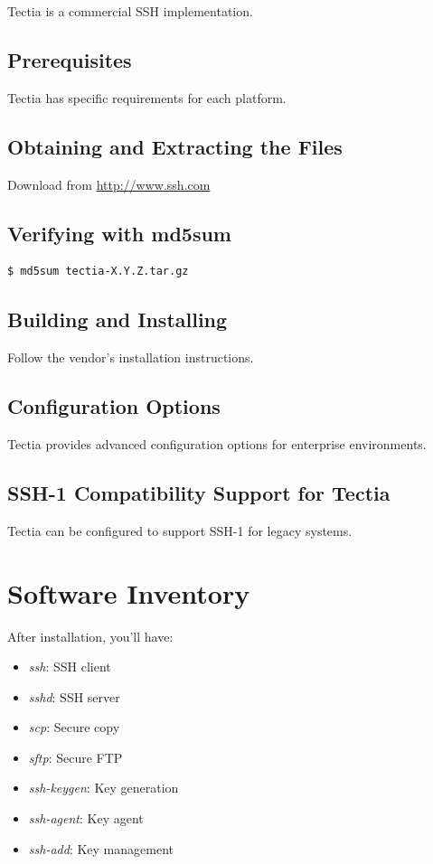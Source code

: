 \documentclass[12pt]{book}
\begin{document}
Tectia is a commercial SSH implementation.

\subsection{Prerequisites}

Tectia has specific requirements for each platform.

\subsection{Obtaining and Extracting the Files}

Download from \url{http://www.ssh.com}

\subsection{Verifying with md5sum}

\begin{lstlisting}[language=bash]
$ md5sum tectia-X.Y.Z.tar.gz
\end{lstlisting}

\subsection{Building and Installing}

Follow the vendor's installation instructions.

\subsection{Configuration Options}

Tectia provides advanced configuration options for enterprise environments.

\subsection{SSH-1 Compatibility Support for Tectia}

Tectia can be configured to support SSH-1 for legacy systems.

\section{Software Inventory}

After installation, you'll have:
\begin{itemize}
    \item \textit{ssh}: SSH client
    \item \textit{sshd}: SSH server
    \item \textit{scp}: Secure copy
    \item \textit{sftp}: Secure FTP
    \item \textit{ssh-keygen}: Key generation
    \item \textit{ssh-agent}: Key agent
    \item \textit{ssh-add}: Key management
\end{itemize}
\end{document}
